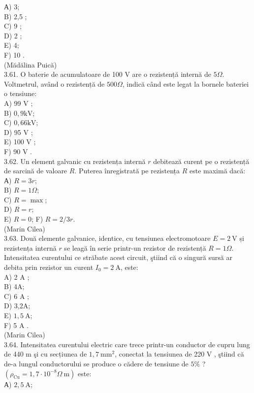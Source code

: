 \documentclass[10pt]{article}
\begin{document}
А) 3;\\
B) 2,5 ;\\
C) 9 ;\\
D) 2 ;\\
E) 4;\\
F) 10 .\\
(Mădălina Puică)\\
3.61. O baterie de acumulatoare de 100 V are o rezistență internă de $5 \Omega$. Voltmetrul, având o rezistență de $500 \Omega$, indică când este legat la bornele bateriei o tensiune:\\
A) 99 V ;\\
B) $0,9 \mathrm{kV}$;\\
C) $0,66 \mathrm{kV}$;\\
D) 95 V ;\\
E) 100 V ;\\
F) 90 V .\\
3.62. Un element galvanic cu rezistența internă $r$ debitează curent pe o rezistență de sarcină de valoare $R$. Puterea înregistrată pe rezistența $R$ este maximă dacă:\\
А) $R=3 r$;\\
B) $R=1 \Omega$;\\
C) $R=\max$;\\
D) $R=r$;\\
E) $R=0$; F) $R=2 / 3 r$.\\
(Marin Cilea)\\
3.63. Două elemente galvanice, identice, cu tensiunea electromotoare $E=2 \mathrm{~V}$ și rezistența internă $r$ se leagă în serie printr-un rezistor de rezistență $R=1 \Omega$. Intensitatea curentului ce străbate acest circuit, ştiind că o singură sursă ar debita prin rezistor un curent $I_{0}=2 \mathrm{~A}$, este:\\
A) 2 A ;\\
B) 4A;\\
C) 6 A ;\\
D) 3,2A;\\
E) $1,5 \mathrm{~A}$;\\
F) 5 A .\\
(Marin Cilea)\\
3.64. Intensitatea curentului electric care trece printr-un conductor de cupru lung de 440 m şi cu secțiunea de $1,7 \mathrm{~mm}^{2}$, conectat la tensiunea de 220 V , ştiind că de-a lungul conductorului se produce o cădere de tensiune de $5 \%$ ? $\left(\rho_{\mathrm{Cu}}=1,7 \cdot 10^{-8} \Omega \mathrm{~m}\right)$ este:\\
А) $2,5 \mathrm{~A}$;\\
\end{document}
